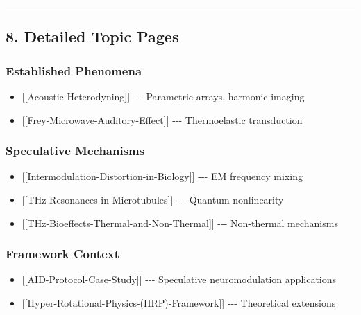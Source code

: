\begin{center}\rule{0.5\linewidth}{0.5pt}\end{center}

\subsection{8. Detailed Topic Pages}\label{detailed-topic-pages}

\subsubsection{\texorpdfstring{Established Phenomena
}{Established Phenomena }}\label{established-phenomena}

\begin{itemize}
\tightlist
\item
  {[}{[}Acoustic-Heterodyning{]}{]} -\/-\/- Parametric arrays, harmonic
  imaging\\
\item
  {[}{[}Frey-Microwave-Auditory-Effect{]}{]} -\/-\/- Thermoelastic
  transduction
\end{itemize}

\subsubsection{\texorpdfstring{Speculative Mechanisms
}{Speculative Mechanisms }}\label{speculative-mechanisms}

\begin{itemize}
\tightlist
\item
  {[}{[}Intermodulation-Distortion-in-Biology{]}{]} -\/-\/- EM frequency
  mixing\\
\item
  {[}{[}THz-Resonances-in-Microtubules{]}{]} -\/-\/- Quantum
  nonlinearity\\
\item
  {[}{[}THz-Bioeffects-Thermal-and-Non-Thermal{]}{]} -\/-\/- Non-thermal
  mechanisms
\end{itemize}

\subsubsection{Framework Context}\label{framework-context}

\begin{itemize}
\tightlist
\item
  {[}{[}AID-Protocol-Case-Study{]}{]} -\/-\/- Speculative
  neuromodulation applications\\
\item
  {[}{[}Hyper-Rotational-Physics-(HRP)-Framework{]}{]} -\/-\/-
  Theoretical extensions
\end{itemize}

